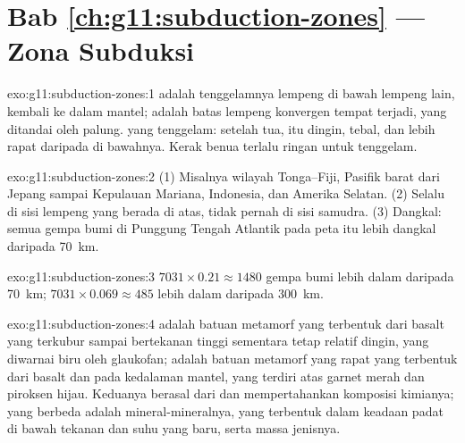 \section*{Bab \ref{ch:g11:subduction-zones} --- Zona Subduksi}

\begin{solution}{exo:g11:subduction-zones:1}
 adalah tenggelamnya lempeng  di bawah lempeng lain,
kembali ke dalam mantel;  adalah batas lempeng konvergen tempat
 terjadi, yang ditandai oleh palung.  yang tenggelam:
setelah tua,  itu dingin, tebal, dan lebih rapat daripada  di
bawahnya. Kerak benua terlalu ringan untuk tenggelam.
\end{solution}

\begin{solution}{exo:g11:subduction-zones:2}
(1) Misalnya wilayah Tonga--Fiji, Pasifik barat dari Jepang sampai Kepulauan
Mariana, Indonesia, dan Amerika Selatan. (2) Selalu di sisi lempeng yang berada
di atas, tidak pernah di sisi samudra. (3) Dangkal: semua gempa bumi di Punggung
Tengah Atlantik pada peta itu lebih dangkal daripada \qty{70}{km}.
\end{solution}

\begin{solution}{exo:g11:subduction-zones:3}
$7031 \times 0.21 \approx 1480$ gempa bumi lebih dalam daripada \qty{70}{km};
$7031 \times 0.069 \approx 485$ lebih dalam daripada \qty{300}{km}.
\end{solution}

\begin{solution}{exo:g11:subduction-zones:4}
 adalah batuan metamorf yang terbentuk dari basalt  yang
terkubur sampai bertekanan tinggi sementara tetap relatif dingin, yang diwarnai
biru oleh glaukofan;  adalah batuan metamorf yang rapat yang terbentuk
dari basalt dan  pada kedalaman mantel, yang terdiri atas garnet merah dan
piroksen hijau. Keduanya berasal dari  dan mempertahankan komposisi
kimianya; yang berbeda adalah mineral-mineralnya, yang terbentuk dalam keadaan
padat di bawah tekanan dan suhu yang baru, serta massa jenisnya.
\end{solution}


